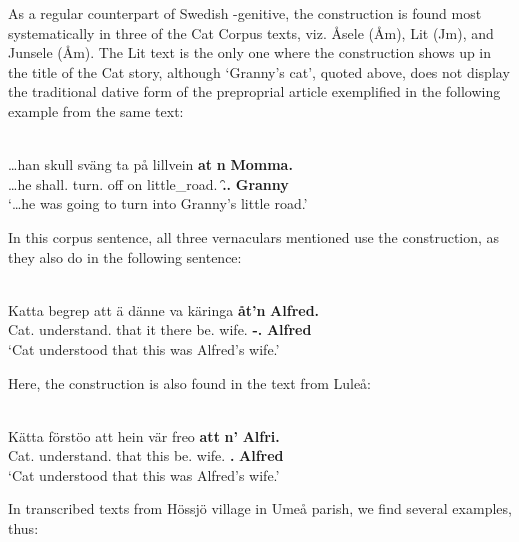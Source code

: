 As a regular counterpart of Swedish -genitive, the  construction is\textit{ }found most systematically in three of the Cat Corpus texts, viz. Åsele (Åm), Lit (Jm), and Junsele (Åm). The Lit text is the only one where the  construction shows up in the title of the Cat story, although ‘Granny’s cat’, quoted above, does not display the traditional dative form  of the preproprial article exemplified in the following example from the same text:

\ea\label{}
\\
\gll …han  skull  sväng  ta  på  lillvein  \textbf{at} \textbf{n} \textbf{Momma.}\\
…he  shall.{\pst}  turn.{\inf} off  on  little\_road.{}  \textbf{{\poss}} \textbf{{\pda}.{\f}.{\dat}} \textbf{Granny}\\
\glt ‘…he was going to turn into Granny’s little road.’
\z

In this corpus sentence, all three vernaculars mentioned use the  construction, as they also do in the following sentence:

\ea\label{}
\\
\gll Katta  begrep  att  ä  dänne  va  käringa  \textbf{åt’n} \textbf{Alfred.}\\
Cat.{}  understand.{\pst}  that  it  there  be.{\pst}  wife.{}  \textbf{{\poss}-{\pda}.{\m}} \textbf{Alfred}\\
\glt ‘Cat understood that this was Alfred’s wife.’
\z

Here, the construction is also found in the text from Luleå:


\ea\label{}
\\
\gll Kätta  förstöo  att  hein  vär  freo  \textbf{att} \textbf{n’} \textbf{Alfri.}\\
Cat.{}  understand.{\pst}  that  this  be.{\pst}  wife.{}  \textbf{{\poss}} \textbf{{\pda}.{\m}} \textbf{Alfred}\\
\glt ‘Cat understood that this was Alfred’s wife.’
\z

In transcribed texts from Hössjö village in Umeå parish, we find several examples, thus:

